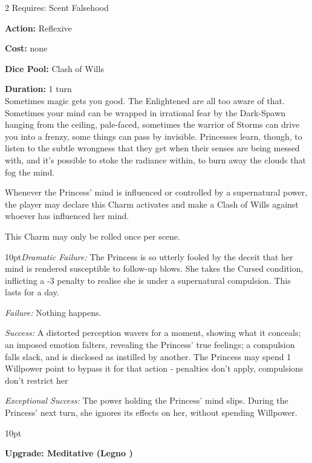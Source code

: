 \begin{multicols}{2}
\noindent Requires: Scent Falsehood

\noindent \textbf{Action:} Reflexive

\noindent \textbf{Cost:} none

\noindent \textbf{Dice Pool:} Clash of Wills

\noindent \textbf{Duration:} 1 turn \\

\noindent Sometimes magic gets you good. The Enlightened are all too aware of that. Sometimes your mind can be wrapped in irrational fear by the Dark-Spawn hanging from the ceiling, pale-faced, sometimes the warrior of Storms can drive you into a frenzy, some things can pass by invisible. Princesses learn, though, to listen to the subtle wrongness that they get when their senses are being messed with, and it's possible to stoke the radiance within, to burn away the clouds that fog the mind.

Whenever the Princess' mind is influenced or controlled by a supernatural power, the player may declare this Charm activates and make a Clash of Wills against whoever has influenced her mind.

This Charm may only be rolled once per scene. 

    \begin{myindentpar}{10pt}\emph{Dramatic Failure:} The Princess is so utterly fooled by the deceit that her mind is rendered susceptible to follow-up blows. She takes the Cursed condition, inflicting a -3 penalty to realise she is under a supernatural compulsion. This lasts for a day. 

    \emph{Failure:} Nothing happens.

    \emph{Success:} A distorted perception wavers for a moment, showing what it conceals; an imposed emotion falters, revealing the Princess’ true feelings; a compulsion falls slack, and is disclosed as instilled by another. The Princess may spend 1 Willpower point to bypass it for that action - penalties don’t apply, compulsions don’t restrict her

    \emph{Exceptional Success:}  The power holding the Princess’ mind slips. During the Princess’ next turn, she ignores its effects on her, without spending Willpower.\end{myindentpar}

\begin{myindentpar}{10pt}

\textbf{Upgrade: Meditative (Legno \textbullet\textbullet\textbullet)}


\end{myindentpar}
\end{multicols}
